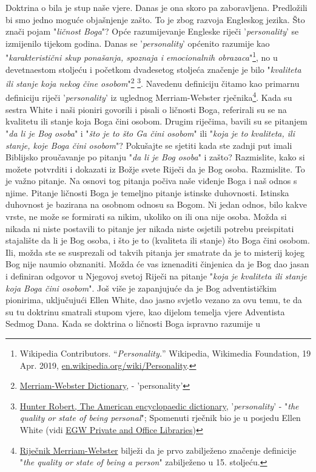 Doktrina o  bila je stup naše vjere. Danas je ona skoro pa zaboravljena. Predložili bi smo jedno moguće objašnjenje zašto. To je zbog razvoja Engleskog jezika. Što znači pojam "\textit{ličnost Boga}"? Opće razumijevanje Engleske riječi '\textit{personality}' se izmijenilo tijekom godina. Danas se '\textit{personality}' općenito razumije kao "\textit{karakteristični skup ponašanja, spoznaja i emocionalnih obrazaca}"\footnote{Wikipedia Contributors. “\textit{Personality.}” Wikipedia, Wikimedia Foundation, 19 Apr. 2019, \href{https://en.wikipedia.org/wiki/Personality}{en.wikipedia.org/wiki/Personality}.}, no u devetnaestom stoljeću i početkom dvadesetog stoljeća značenje je bilo "\textit{kvaliteta ili stanje koja nekog čine osobom}"\footnote{\href{https://www.merriam-webster.com/dictionary/personality}{Merriam-Webster Dictionary}, - 'personality'} \footnote{\href{https://babel.hathitrust.org/cgi/pt?id=mdp.39015050663213&view=1up&seq=780}{Hunter Robert, The American encyclopaedic dictionary}, '\textit{personality}' - "\textit{the quality or state of being personal}"; Spomenuti rječnik bio je u posjedu Ellen White (vidi \href{https://repo.adventistdigitallibrary.org/PDFs/adl-22/adl-22251050.pdf?_ga=2.116010630.1065317374.1621993520-1506151612.1617862694&fbclid=IwAR3vwmp8jxtnpPEKv0KD9mCv8dJpmRGoyIXW0CkbQAjbU0h6YaBGqhgBzbk}{EGW Private and Office Libraries})}. Navedenu definiciju čitamo kao primarnu definiciju riječi '\textit{personality}' iz uglednog Merriam-Webster rječnika\footnote{\href{https://www.merriam-webster.com/dictionary/personality\#word-history}{Riječnik Merriam-Webster} bilježi da je prvo zabilježeno značenje definicije "\textit{the quality or state of being a person}" zabilježeno u 15. stoljeću.}. Kada su sestra White i naši pioniri govorili i pisali o ličnosti Boga, referirali su se na kvalitetu ili stanje koja Boga čini osobom. Drugim riječima, bavili su se pitanjem "\textit{da li je Bog osoba}" i "\textit{što je to što Ga čini osobom}" ili "\textit{koja je to kvaliteta, ili stanje, koje Boga čini osobom}"? Pokušajte se sjetiti kada ste zadnji put imali Biblijsko proučavanje po pitanju "\textit{da li je Bog osoba}" i zašto? Razmislite, kako si možete potvrditi i dokazati iz Božje svete Riječi da je Bog osoba. Razmislite. To je važno pitanje. Na osnovi tog pitanja počiva naše viđenje Boga i naš odnos s njime. Pitanje ličnosti Boga je temeljno pitanje istinske duhovnosti. Istinska duhovnost je bazirana na osobnom odnosu sa Bogom. Ni jedan odnos, bilo kakve vrste, ne može se formirati sa nikim, ukoliko on ili ona nije osoba. Možda si nikada ni niste postavili to pitanje jer nikada niste osjetili potrebu preispitati stajalište da li je Bog osoba, i što je to (kvaliteta ili stanje) što Boga čini osobom. Ili, možda ste se susprezali od takvih pitanja jer smatrate da je to misterij kojeg Bog nije naumio obznaniti. Možda će vas iznenaditi činjenica da je Bog dao jasan i definiran odgovor u Njegovoj svetoj Riječi na pitanje "\textit{koja je kvaliteta ili stanje koja Boga čini osobom}". Još više je zapanjujuće da je Bog adventističkim pionirima, uključujući Ellen White, dao jasno svjetlo vezano za ovu temu, te da su tu doktrinu smatrali stupom vjere, kao dijelom temelja vjere Adventista Sedmog Dana. Kada se doktrina o ličnosti Boga ispravno razumije u 